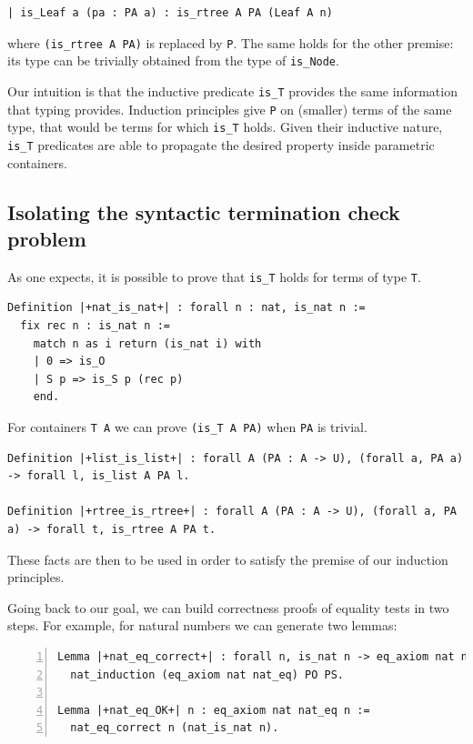 \documentclass[a4paper,UKenglish,cleveref, autoref]{lipics-v2019}
\begin{document}
\begin{lstlisting}
| is_Leaf a (pa : PA a) : is_rtree A PA (Leaf A n)
\end{lstlisting}

\noindent
where \lstinline+(is_rtree A PA)+ is replaced by \lstinline+P+.
The same holds for the other premise: its type can be trivially
obtained from the type of \lstinline+is_Node+.

Our intuition is that the inductive predicate \lstinline+is_T+
provides the same information that typing provides. Induction
principles give \lstinline+P+ on (smaller) terms of the same type,
that would be terms for which \lstinline+is_T+ holds.
Given their inductive nature, \lstinline+is_T+ predicates
are able to propagate the desired property inside parametric
containers.

\subsection{Isolating the syntactic termination check problem} %
\label{sec:idea:transparent}

As one expects, it is possible to prove that \lstinline+is_T+
holds for terms of type \lstinline+T+.

\begin{lstlisting}
Definition |+nat_is_nat+| : forall n : nat, is_nat n :=
  fix rec n : is_nat n :=
    match n as i return (is_nat i) with
    | 0 => is_O
    | S p => is_S p (rec p)
    end.
\end{lstlisting}

\noindent
For containers \lstinline+T A+ we can prove \lstinline+(is_T A PA)+
when \lstinline+PA+ is trivial.

\begin{lstlisting}
Definition |+list_is_list+| : forall A (PA : A -> U), (forall a, PA a) -> forall l, is_list A PA l.

Definition |+rtree_is_rtree+| : forall A (PA : A -> U), (forall a, PA a) -> forall t, is_rtree A PA t.
\end{lstlisting}

\noindent
These facts are then to be used in order to satisfy the
premise of our induction principles. 

Going back to our goal, we can build correctness
proofs of equality tests in two steps.
For example, for natural numbers we can generate two
lemmas:

\begin{lstlisting}[numbers=left]
Lemma |+nat_eq_correct+| : forall n, is_nat n -> eq_axiom nat nat_eq n :=
  nat_induction (eq_axiom nat nat_eq) PO PS.

Lemma |+nat_eq_OK+| n : eq_axiom nat nat_eq n :=
  nat_eq_correct n (nat_is_nat n).
\end{lstlisting}
\end{document}
